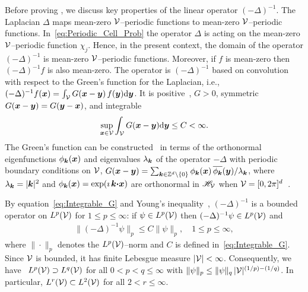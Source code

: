 \documentclass[amsa]{ipart}
\begin{document}
Before proving , we discuss key
properties of the linear operator $(-\Delta)^{-1}$. The Laplacian
$\Delta$ maps mean-zero $\mathcal{V}$--periodic functions to mean-zero
$\mathcal{V}$--periodic functions. In~\eqref{eq:Periodic_Cell_Prob} the
operator $\Delta$ is acting on the mean-zero $\mathcal{V}$--periodic function
$\chi_j$. Hence, in the present context, the domain of the operator
$(-\Delta)^{-1}$ is mean-zero $\mathcal{V}$--periodic functions. Moreover, if $f$
is mean-zero then $(-\Delta)^{-1}f$ is also mean-zero.  The operator is
$(-\Delta)^{-1}$ based on convolution with respect to the Green's function
for the Laplacian, i.e.,
$(-\Delta)^{-1}f(\boldsymbol{x})=\int_{\mathcal{V}}G(\boldsymbol{x}-\boldsymbol{y})\,f(\boldsymbol{y})\mathrm{d}\boldsymbol{y}$. It is
positive~\cite{Stakgold:BVP:2000}, $G>0$,
symmetric~\cite{Folland:95:PDEs,Stakgold:BVP:2000}  
$G(\boldsymbol{x}-\boldsymbol{y})=G(\boldsymbol{y}-\boldsymbol{x})$,
and integrable~\cite{Melnikov:2012:Green,Melnikov2006774,McCann08042001}
%
\begin{align}\label{eq:Integrable_G}
 \sup_{\vecx\in\Vc} \int_{\Vc}G(\vecx-\vecy)\d\vecy\leq C<\infty.
\end{align}
%
The Green's function can be constructed~\cite{Melnikov:2012:Green} in
terms of the orthonormal eigenfunctions $\phi_{\boldsymbol{k}}(\boldsymbol{x})$ and
eigenvalues $\lambda_{\boldsymbol{k}}$ of the operator $-\Delta$ with periodic boundary
conditions on $\mathcal{V}$, $G(\boldsymbol{x}-\boldsymbol{y})=\sum_{\boldsymbol{k}\in\mathbb{Z}^d\backslash\{0\}}
\phi_{\boldsymbol{k}}(\boldsymbol{x})\,\overline{\phi_{\boldsymbol{k}}}(\boldsymbol{y})/\lambda_{\boldsymbol{k}}$,   
where $\lambda_{\boldsymbol{k}}=|\boldsymbol{k}|^2$ and
$\phi_{\boldsymbol{k}}(\boldsymbol{x})=\exp(\imath\,\boldsymbol{k}\mbox{\boldmath${\cdot}$}\boldsymbol{x})$ are orthonormal in
$\mathscr{H}_{\mathcal{V}}$ when
$\mathcal{V}=[0,2\pi]^d$~\cite{Folland:99:RealAnalysis}. 



By equation~\eqref{eq:Integrable_G} and Young's
inequality~\cite{Folland:95:PDEs,Folland:99:RealAnalysis}, 
$(-\Delta)^{-1}$ is a bounded operator on $L^p(\mathcal{V})$ for $1\leq p\leq\infty$: if $\psi\in
L^p(\mathcal{V})$ then $(-\Delta)^{-1}\psi\in L^p(\mathcal{V})$ and   
%
\begin{align}\label{eq:Young_Ineq}
  \|(-\Delta)^{-1}\psi\|_p\leq C\|\psi\|_p,
  \quad
  1\leq p\leq\infty,
\end{align}
%
where $\|\cdot\|_p$ denotes the $L^p(\mathcal{V})$--norm and $C$ is defined
in~\eqref{eq:Integrable_G}. Since $\mathcal{V}$ is bounded, it has finite
Lebesgue measure $|\mathcal{V}|<\infty$. Consequently, we 
have~\cite{Folland:99:RealAnalysis} $L^p(\mathcal{V})\supset L^q(\mathcal{V})$ for all
$0<p<q\leq\infty$ with $\|\psi\|_p\leq\|\psi\|_q\,|\mathcal{V}|^{(1/p)-(1/q)}$. In particular,
$L^r(\mathcal{V})\subset L^2(\mathcal{V})$ for all $2<r\leq\infty$.
\end{document}
